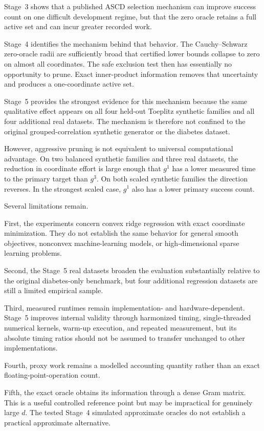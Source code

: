 \documentclass[11pt]{article}
\begin{document}
Stage~3 shows that a published ASCD selection mechanism can improve
success count on one difficult development regime, but that the zero
oracle retains a full active set and can incur greater recorded work.

Stage~4 identifies the mechanism behind that behavior. The
Cauchy--Schwarz zero-oracle radii are sufficiently broad that certified
lower bounds collapse to zero on almost all coordinates. The safe
exclusion test then has essentially no opportunity to prune. Exact
inner-product information removes that uncertainty and produces a
one-coordinate active set.

Stage~5 provides the strongest evidence for this mechanism because the
same qualitative effect appears on all four held-out Toeplitz synthetic
families and all four additional real datasets. The mechanism is
therefore not confined to the original grouped-correlation synthetic
generator or the diabetes dataset.

However, aggressive pruning is not equivalent to universal computational
advantage. On two balanced synthetic families and three real datasets,
the reduction in coordinate effort is large enough that $g^1$ has a
lower measured time to the primary target than $g^3$. On both scaled
synthetic families the direction reverses. In the strongest scaled case,
$g^1$ also has a lower primary success count.

Several limitations remain.

First, the experiments concern convex ridge regression with exact
coordinate minimization. They do not establish the same behavior for
general smooth objectives, nonconvex machine-learning models, or
high-dimensional sparse learning problems.

Second, the Stage~5 real datasets broaden the evaluation substantially
relative to the original diabetes-only benchmark, but four additional
regression datasets are still a limited empirical sample.

Third, measured runtimes remain implementation- and hardware-dependent.
Stage~5 improves internal validity through harmonized timing,
single-threaded numerical kernels, warm-up execution, and repeated
measurement, but its absolute timing ratios should not be assumed to
transfer unchanged to other implementations.

Fourth, proxy work remains a modelled accounting quantity rather than
an exact floating-point-operation count.

Fifth, the exact oracle obtains its information through a dense Gram
matrix. This is a useful controlled reference point but may be
impractical for genuinely large $d$. The tested Stage~4 simulated
approximate oracles do not establish a practical approximate alternative.
\end{document}

